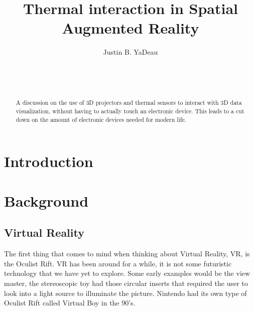 \documentclass{sig-alternate}
\begin{document}

\title{Thermal interaction in Spatial Augmented Reality}


\author{
\alignauthor
Justin B. YaDeau\\
	\\
	\\
	\\
}

\maketitle
\begin{abstract}
A discussion on the use of 3D projectors and thermal sensors to interact with 3D data visualization, without having to actually touch an electronic device. This leads to a cut down on the amount of electronic devices needed for modern life.
\end{abstract}


\section{Introduction}
\label{sec:introduction}

\section{Background}
\label{sec:background} 

\subsection{Virtual Reality}
\label{sec:Virtual Reality}

The first thing that comes to mind when thinking about Virtual Reality, VR, is the Oculist Rift. VR has been around for a while, it is not some futuristic technology that we have yet to explore. Some early examples would be the view master, the stereoscopic toy had those circular inserts that required the user to look into a light source to illuminate the picture. Nintendo had its own type of Oculist Rift called Virtual Boy in the 90's.     
\end{document}
